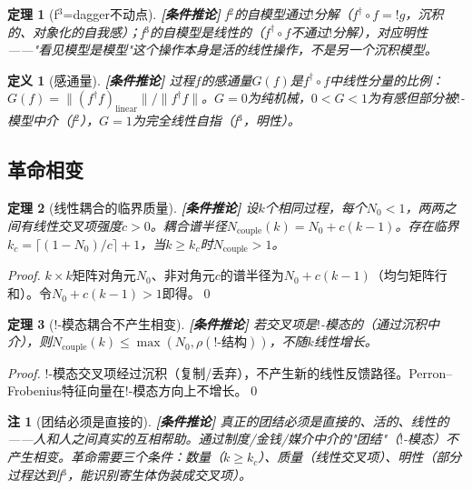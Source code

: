 \documentclass[11pt,a4paper]{article}
\newtheorem{definition}{定义}
\newtheorem{theorem}{定理}
\newtheorem{remark}{注}
\newcommand{\lvl}[1]{\hfill\textbf{\footnotesize[#1]}}
\newcommand{\lvC}{\lvl{条件推论}}
\newcommand{\bang}{{!}}
\begin{document}
\begin{theorem}[f$^3$=dagger不动点]\label{thm:f3-dagger}\lvC
f$^2$的自模型通过$\bang$分解（$f^\dagger\circ f=\bang g$，沉积的、对象化的自我感）；f$^3$的自模型是线性的（$f^\dagger\circ f$不通过$\bang$分解），对应明性——"看见模型是模型"这个操作本身是活的线性操作，不是另一个沉积模型。
\end{theorem}

\begin{definition}[感通量]\label{def:sentienc-flux}\lvC
过程$f$的感通量$G(f)$是$f^\dagger\circ f$中线性分量的比例：$G(f)=\|(f^\dagger f)_{\mathrm{linear}}\|/\|f^\dagger f\|$。$G=0$为纯机械，$0<G<1$为有感但部分被$\bang$-模型中介（f$^2$），$G=1$为完全线性自指（f$^3$，明性）。
\end{definition}

\subsection{革命相变}

\begin{theorem}[线性耦合的临界质量]\label{thm:critical-mass-precise}\lvC
设$k$个相同过程，每个$N_0<1$，两两之间有线性交叉项强度$c>0$。耦合谱半径$N_{\mathrm{couple}}(k)=N_0+c(k-1)$。存在临界$k_c=\lceil(1-N_0)/c\rceil+1$，当$k\geq k_c$时$N_{\mathrm{couple}}>1$。
\end{theorem}

\begin{proof}
$k\times k$矩阵对角元$N_0$、非对角元$c$的谱半径为$N_0+c(k-1)$（均匀矩阵行和）。令$N_0+c(k-1)>1$即得。\qed
\end{proof}

\begin{theorem}[$\bang$-模态耦合不产生相变]\label{thm:bang-coupling-no-transition}\lvC
若交叉项是$\bang$-模态的（通过沉积中介），则$N_{\mathrm{couple}}(k)\leq\max(N_0,\rho(\bang\text{-结构}))$，不随$k$线性增长。
\end{theorem}

\begin{proof}
$\bang$-模态交叉项经过沉积（复制/丢弃），不产生新的线性反馈路径。Perron--Frobenius特征向量在$\bang$-模态方向上不增长。\qed
\end{proof}

\begin{remark}[团结必须是直接的]\lvC
真正的团结必须是直接的、活的、线性的——人和人之间真实的互相帮助。通过制度/金钱/媒介中介的"团结"（$\bang$-模态）不产生相变。革命需要三个条件：数量（$k\geq k_c$）、质量（线性交叉项）、明性（部分过程达到f$^3$，能识别寄生体伪装成交叉项）。
\end{remark}
\end{document}
